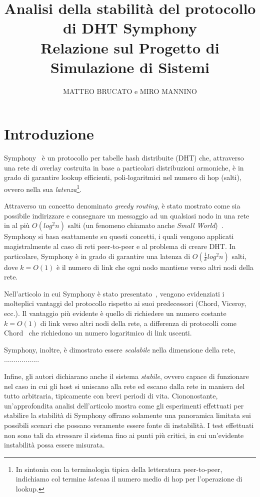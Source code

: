 \documentclass[prodmode,acmtap]{acmlarge}
\title{Analisi della stabilità del protocollo di DHT Symphony\\
\Large{Relazione sul Progetto di Simulazione di Sistemi}
}
\author{MATTEO BRUCATO e MIRO MANNINO\affil{Università di Bologna}
}
\begin{document}
\maketitle


\section{Introduzione}

Symphony~\cite{symphony} è un protocollo per tabelle hash distribuite (DHT) che, attraverso una rete di overlay costruita in base a particolari distribuzioni armoniche, è in grado di garantire lookup efficienti, poli-logaritmici nel numero di hop (salti), ovvero nella sua \emph{latenza}\footnote{In sintonia con la terminologia tipica della letteratura peer-to-peer, indichiamo col termine \emph{latenza} il numero medio di hop per l'operazione di lookup.}.

Attraverso un concetto denominato \emph{greedy routing}, è stato mostrato come sia possibile indirizzare e consegnare un messaggio ad un qualsiasi nodo in una rete in al più $O(log^2 n)$ salti (un fenomeno chiamato anche \emph{Small World})~\cite{small-world}. Symphony si basa esattamente su questi concetti, i quali vengono applicati magistralmente al caso di reti peer-to-peer e al problema di creare DHT. In particolare, Symphony è in grado di garantire una latenza di $O(\frac{1}{k} log^2 n)$ salti, dove $k=O(1)$ è il numero di link che ogni nodo mantiene verso altri nodi della rete.

Nell'articolo in cui Symphony è stato presentato~\cite{symphony}, vengono evidenziati i molteplici vantaggi del protocollo rispetto ai suoi predecessori (Chord, Viceroy, ecc.). Il vantaggio più evidente è quello di richiedere un numero costante $k=O(1)$ di link verso altri nodi della rete, a differenza di protocolli come Chord~\cite{chord} che richiedono un numero logaritmico di link uscenti.

Symphony, inoltre, è dimostrato essere \emph{scalabile} nella dimensione della rete, ..................

Infine, gli autori dichiarano anche il sistema \emph{stabile}, ovvero capace di funzionare nel caso in cui gli host si uniscano alla rete ed escano dalla rete in maniera del tutto arbitraria, tipicamente con brevi periodi di vita. Ciononostante, un'approfondita analisi dell'articolo mostra come gli esperimenti effettuati per stabilire la stabilità di Symphony offrano solamente una panoramica limitata sui possibili scenari che possano veramente essere fonte di instabilità. I test effettuati non sono tali da stressare il sistema fino ai punti più critici, in cui un'evidente instabilità possa essere misurata.
\end{document}
